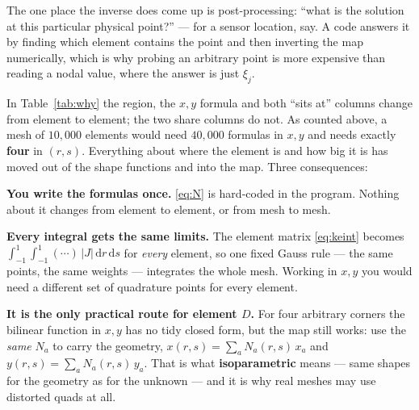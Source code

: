 \documentclass[11pt]{article}
\begin{document}
\medskip
{\small\color{black!60}The one place the inverse does come up is
post-processing: ``what is the solution at this particular physical point?''
--- for a sensor location, say. A code answers it by finding which element
contains the point and then inverting the map numerically, which is why probing
an arbitrary point is more expensive than reading a nodal value, where the
answer is just $\xi_{j}$.}

\medskip
\noindent
\noindent{}

\medskip
\noindent
In Table~\ref{tab:why} the region, the $x,y$ formula and both ``sits at''
columns change from element to element; the two share columns do not. As
counted above, a mesh of $10{,}000$ elements would need $40{,}000$ formulas in
$x,y$ and needs exactly \textbf{four} in $(r,s)$. Everything about where the
element is and how big it is has moved out of the shape functions and into the
map. Three consequences:

\begin{steps}
\item \textbf{You write the formulas once.} \eqref{eq:N} is hard-coded in the
      program. Nothing about it changes from element to element, or from mesh
      to mesh.
\item \textbf{Every integral gets the same limits.} The element matrix
      \eqref{eq:keint} becomes
      $\int_{-1}^{1}\!\int_{-1}^{1}(\cdots)\,|J|\,\mathrm{d}r\,\mathrm{d}s$ for
      \emph{every} element, so one fixed Gauss rule --- the same points, the
      same weights --- integrates the whole mesh. Working in $x,y$ you would
      need a different set of quadrature points for every element.
\item \textbf{It is the only practical route for element $D$.} For four
      arbitrary corners the bilinear function in $x,y$ has no tidy closed form,
      but the map still works: use the \emph{same} $N_{a}$ to carry the
      geometry, $x(r,s)=\sum_{a}N_{a}(r,s)\,x_{a}$ and
      $y(r,s)=\sum_{a}N_{a}(r,s)\,y_{a}$. That is what
      \textbf{isoparametric} means --- same shapes for the geometry as for the
      unknown --- and it is why real meshes may use distorted quads at all.
\end{steps}
\end{document}
